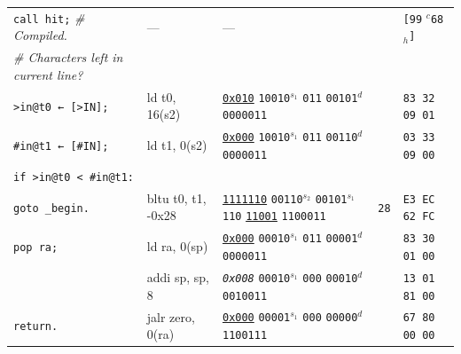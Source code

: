 \documentclass[a4paper,12pt,final]{article}
\begin{document}
\begin{table}[!htbp]
\begin{adjustwidth}{-1cm}{-1cm}
\begin{center}
\begin{tabular}{l|ll|l|l}
\hspace{1.053000em} \texttt{call hit;}    \hspace{1.053000em}​\emph{\# Compiled.} & --- & --- &  & \texttt{[99} \(^{c}\)​\texttt{68}​\(_{h}\)​\texttt{]}\\[0pt]
\hspace{1.053000em} \emph{\# Characters left in current line?} &  &  &  & \\[0pt]
\hspace{1.053000em} \texttt{>in@t0 ← [>IN];} & ld t0, 16(s2) & \uline{\texttt{0x010}}                    \texttt{10010}​\(^{s_{1}}\) \texttt{011} \texttt{00101}​\(^{d}\)  \texttt{0000011} &  & \texttt{83 32 09 01}\\[0pt]
\hspace{1.053000em} \texttt{\#in@t1 ← [\#IN];} & ld t1, 0(s2) & \uline{\texttt{0x000}}                    \texttt{10010}​\(^{s_{1}}\) \texttt{011} \texttt{00110}​\(^{d}\)  \texttt{0000011} &  & \texttt{03 33 09 00}\\[0pt]
\hspace{1.053000em} \texttt{if >in@t0 < \#in@t1:} &  &  &  & \\[0pt]
\hspace{2.106000em}   \texttt{goto \_begin.} & bltu t0, t1, -0x28 & \uline{\texttt{1111110}} \texttt{00110}​\(^{s_{2}}\) \texttt{00101}​\(^{s_{1}}\) \texttt{110} \uline{\texttt{11001}} \texttt{1100011} & \texttt{28} & \texttt{E3 EC 62 FC}\\[0pt]
\hspace{1.053000em} \texttt{pop ra;} & ld ra, 0(sp) & \uline{\texttt{0x000}}                    \texttt{00010}​\(^{s_{1}}\) \texttt{011} \texttt{00001}​\(^{d}\)  \texttt{0000011} &  & \texttt{83 30 01 00}\\[0pt]
\hspace{1.053000em} & addi sp, sp, 8 & \emph{\texttt{0x008}}                    \texttt{00010}​\(^{s_{1}}\) \texttt{000} \texttt{00010}​\(^{d}\)  \texttt{0010011} &  & \texttt{13 01 81 00}\\[0pt]
\hspace{1.053000em} \texttt{return.} & jalr zero, 0(ra) & \uline{\texttt{0x000}}                    \texttt{00001}​\(^{s_{1}}\) \texttt{000} \texttt{00000}​\(^{d}\)  \texttt{1100111} &  & \texttt{67 80 00 00}\\[0pt]
\end{tabular}

\end{center}
\normalsize \end{adjustwidth} \end{table} \vspace{0}
\end{document}
